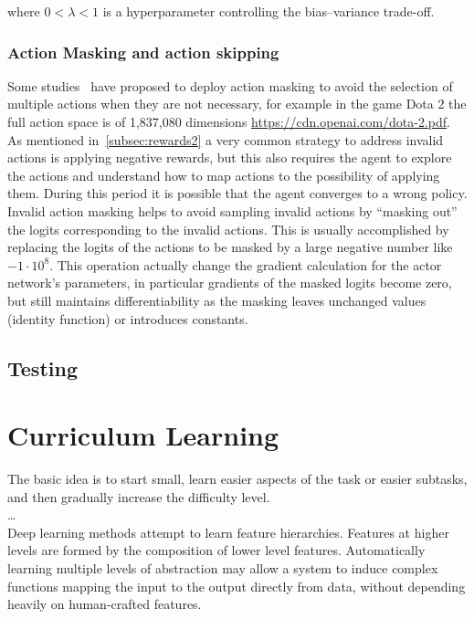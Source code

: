 \documentclass[11pt, a4paper, hidelinks]{report}
\begin{document}
where $0 < \lambda < 1$ is a hyperparameter controlling the bias–variance trade-off.


\subsubsection{Action Masking and action skipping}\label{subsubsec:action_masking_ppo}
Some studies~\cite{ppo_action_masking} have proposed to deploy action masking to avoid the selection of multiple actions when they are not necessary, for example in the game Dota 2 the full action space is of 1,837,080 dimensions \url{https://cdn.openai.com/dota-2.pdf}.
As mentioned in~\ref{subsec:rewards2} a very common strategy to address invalid actions is applying negative rewards, but this also requires the agent to explore the actions and understand how to map actions to the possibility of applying them.
During this period it is possible that the agent converges to a wrong policy.
Invalid action masking helps to avoid sampling invalid actions by ``masking out'' the logits corresponding to the invalid actions.
This is usually accomplished by replacing the logits of the actions to be masked by a large negative number like $-1 \cdot 10^8$.
This operation actually change the gradient calculation for the actor network's parameters, in particular gradients of the masked logits become zero, but still maintains differentiability as the masking leaves unchanged values (identity function) or introduces constants.

\subsection{Testing}\label{subsec:testing}

\section{Curriculum Learning}\label{sec:meta-reinforcement-learning}

\begin{quoting}[font=itshape, begintext={"}, endtext={"\cite{bengio_curiculum}}]
The basic idea is to start small, learn easier aspects of the task or easier subtasks, and then gradually increase the difficulty level.\\
\dots\\
Deep learning methods attempt to learn feature hierarchies.
Features at higher levels are formed by the composition of lower level features.
Automatically learning multiple levels of abstraction may allow a system to induce complex functions mapping the input to the output directly from data, without depending heavily on human-crafted features.
\end{quoting}
\end{document}
